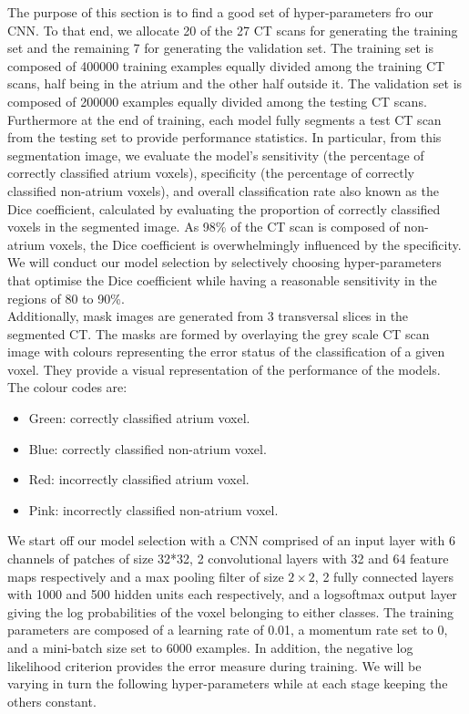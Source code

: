 \noindent The purpose of this section is to find a good set of hyper-parameters fro our CNN. To that end, we allocate 20 of the 27 CT scans for generating the training set and the remaining 7 for generating the validation set. The training set is composed of 400000 training examples equally divided among the training CT scans, half being in the atrium and the other half outside it. The validation set is composed of 200000 examples equally divided among the testing CT scans. Furthermore at the end of training, each model fully segments a test CT scan from the testing set to provide performance statistics. In particular, from this segmentation image, we evaluate the model's sensitivity (the percentage of correctly classified atrium voxels), specificity (the percentage of correctly classified non-atrium voxels), and overall classification rate also known as the Dice coefficient, calculated by evaluating the proportion of correctly classified voxels in the segmented image. As 98\% of the CT scan is composed of non-atrium voxels, the Dice coefficient is overwhelmingly influenced by the specificity. We will conduct our model selection by selectively choosing hyper-parameters that optimise the Dice coefficient while having a reasonable sensitivity in the regions of 80 to 90\%.\\

Additionally, mask images are generated from 3 transversal slices in the segmented CT. The masks are formed by overlaying the grey scale CT scan image with colours representing the error status of the classification of a given voxel. They provide a visual representation of the performance of the models. The colour codes are:

\begin{itemize}
	\item Green: correctly classified atrium voxel.
	\item Blue: correctly classified non-atrium voxel.
	\item Red: incorrectly classified atrium voxel.
	\item Pink: incorrectly classified non-atrium voxel.
\end{itemize}

\noindent We start off our model selection with a CNN comprised of an input layer with 6 channels of patches of size 32*32, 2 convolutional layers with 32 and 64 feature maps respectively and a max pooling filter of size $2 \times 2$, 2 fully connected layers with 1000 and 500 hidden units each respectively, and a logsoftmax output layer giving the log probabilities of the voxel belonging to either classes. The training parameters are composed of a learning rate of 0.01, a momentum rate set to 0, and a mini-batch size set to 6000 examples. In addition, the negative log likelihood criterion provides the error measure during training. We will be varying in turn the following hyper-parameters while at each stage keeping the others constant.\\

